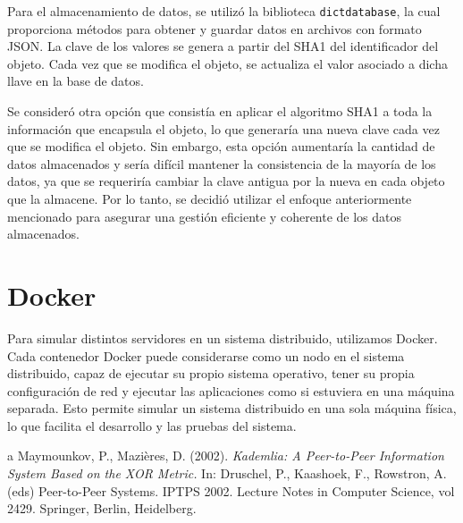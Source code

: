 \documentclass[10pt]{article} %
\begin{document}
	
	Para el almacenamiento de datos, se utilizó la biblioteca \texttt{dictdatabase}, la cual proporciona métodos para obtener y guardar datos en archivos con formato JSON. La clave de los valores se genera a partir del SHA1 del identificador del objeto. Cada vez que se modifica el objeto, se actualiza el valor asociado a dicha llave en la base de datos.
	
	Se consideró otra opción que consistía en aplicar el algoritmo SHA1 a toda la información que encapsula el objeto, lo que generaría una nueva clave cada vez que se modifica el objeto. Sin embargo, esta opción aumentaría la cantidad de datos almacenados y sería difícil mantener la consistencia de la mayoría de los datos, ya que se requeriría cambiar la clave antigua por la nueva en cada objeto que la almacene. Por lo tanto, se decidió utilizar el enfoque anteriormente mencionado para asegurar una gestión eficiente y coherente de los datos almacenados.
	
	
	
	
	
	\section{Docker}
	
	Para simular distintos servidores en un sistema distribuido, utilizamos Docker. Cada contenedor Docker puede considerarse como un nodo en el sistema distribuido, capaz de ejecutar su propio sistema operativo, tener su propia configuración de red y ejecutar las aplicaciones como si estuviera en una máquina separada. Esto permite simular un sistema distribuido en una sola máquina física, lo que facilita el desarrollo y las pruebas del sistema.
	

	
	\begin{thebibliography}
		a
		 Maymounkov, P., Mazières, D. (2002). \textit{Kademlia: A Peer-to-Peer Information System Based on the XOR Metric.} In: Druschel, P., Kaashoek, F., Rowstron, A. (eds) Peer-to-Peer Systems. IPTPS 2002. Lecture Notes in Computer Science, vol 2429. Springer, Berlin, Heidelberg.
	\end{thebibliography}
\end{document}
